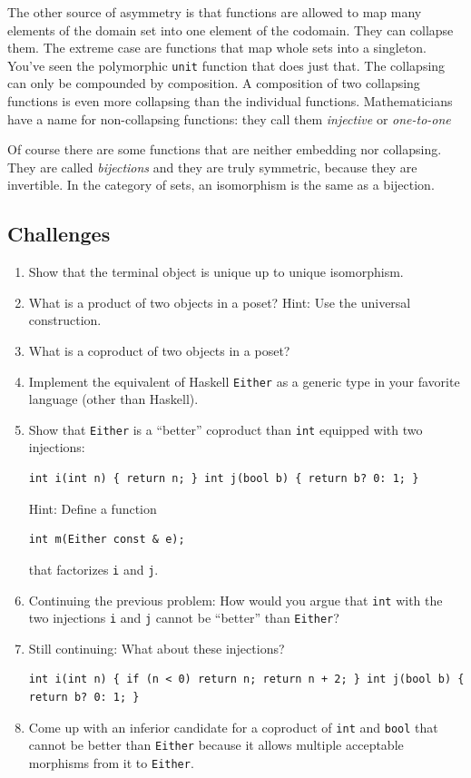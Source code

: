 The other source of asymmetry is that functions are allowed to map many
elements of the domain set into one element of the codomain. They can
collapse them. The extreme case are functions that map whole sets into a
singleton. You've seen the polymorphic \texttt{unit} function that does
just that. The collapsing can only be compounded by composition. A
composition of two collapsing functions is even more collapsing than the
individual functions. Mathematicians have a name for non-collapsing
functions: they call them \emph{injective} or \emph{one-to-one}

Of course there are some functions that are neither embedding nor
collapsing. They are called \emph{bijections} and they are truly
symmetric, because they are invertible. In the category of sets, an
isomorphism is the same as a bijection.

\subsection{Challenges}\label{challenges}

\begin{enumerate}
\item
  Show that the terminal object is unique up to unique isomorphism.
\item
  What is a product of two objects in a poset? Hint: Use the universal
  construction.
\item
  What is a coproduct of two objects in a poset?
\item
  Implement the equivalent of Haskell \texttt{Either} as a generic type
  in your favorite language (other than Haskell).
\item
  Show that \texttt{Either} is a ``better'' coproduct than \texttt{int}
  equipped with two injections:

\begin{verbatim}
int i(int n) { return n; } int j(bool b) { return b? 0: 1; }
\end{verbatim}

  Hint: Define a function

\begin{verbatim}
int m(Either const & e);
\end{verbatim}

  that factorizes \texttt{i} and \texttt{j}.
\item
  Continuing the previous problem: How would you argue that \texttt{int}
  with the two injections \texttt{i} and \texttt{j} cannot be ``better''
  than \texttt{Either}?
\item
  Still continuing: What about these injections?

\begin{verbatim}
int i(int n) { if (n < 0) return n; return n + 2; } int j(bool b) { return b? 0: 1; }
\end{verbatim}
\item
  Come up with an inferior candidate for a coproduct of \texttt{int} and
  \texttt{bool} that cannot be better than \texttt{Either} because it
  allows multiple acceptable morphisms from it to \texttt{Either}.
\end{enumerate}

